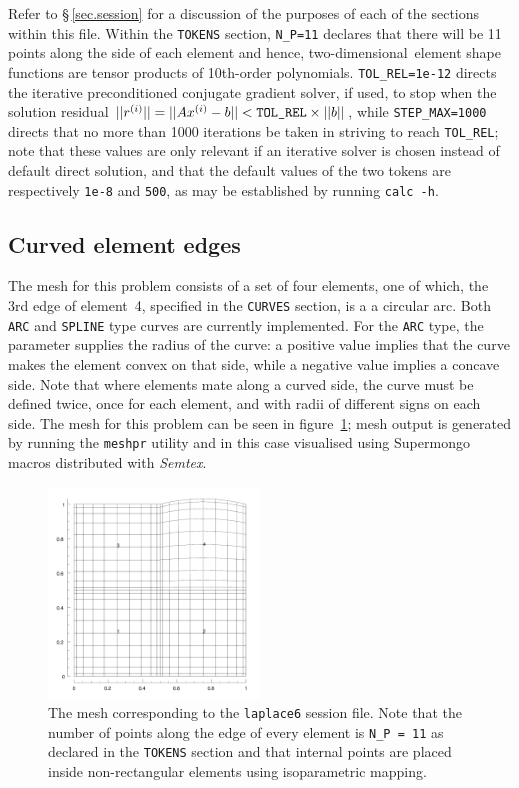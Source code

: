 \documentclass[11pt]{report}
\newcommand{\Semtex}{\emph{Semtex}} \newcommand{\Dog}{\emph{Dog}}
\newcommand\twod{two-di\-men\-sion\-al}
\begin{document}
Refer to \S\,\ref{sec.session} for a discussion of the purposes of
each of the sections within this file.  Within the \verb|TOKENS|
section, \verb|N_P=11| declares that there will be 11 points along the
side of each element and hence, \twod\ element shape functions are
tensor products of 10th-order polynomials.  \verb|TOL_REL=1e-12|
directs the iterative preconditioned conjugate gradient solver, if
used, to stop when the solution residual $||r^{(i)}|| = ||A x^{(i)} -
b|| < \verb|TOL_REL|\times||b||$, while \verb|STEP_MAX=1000| directs that
no more than 1000 iterations be taken in striving to reach
\verb|TOL_REL|; note that these values are only relevant if an
iterative solver is chosen instead of default direct solution, and
that the default values of the two tokens are respectively \verb|1e-8|
and \verb|500|, as may be established by running \verb|calc -h|.

\subsection{Curved element edges}
\label{sec.curves}

The mesh for this problem consists of a set of four elements, one of
which, the 3rd edge of element~4, specified in the \texttt{CURVES}
section, is a a circular arc.  Both \texttt{ARC} and \texttt{SPLINE}
type curves are currently implemented.  For the \texttt{ARC} type, the
parameter supplies the radius of the curve: a positive value implies
that the curve makes the element convex on that side, while a negative
value implies a concave side.  Note that where elements mate along a
curved side, the curve must be defined twice, once for each element,
and with radii of different signs on each side.  The mesh for this
problem can be seen in figure~\ref{lapcurve}; mesh output is generated
by running the \verb|meshpr| utility and in this case visualised using
Supermongo macros distributed with \Semtex.

\begin{figure}
\begin{center}
\includegraphics[width=0.5\textwidth]{laplace6mesh}
\end{center}
\caption{
\label{lapcurve}
  The mesh corresponding to the \texttt{laplace6} session file.  Note
  that the number of points along the edge of every element is
  \texttt{N\_P = 11} as declared in the \texttt{TOKENS} section and
  that internal points are placed inside non-rectangular elements
  using isoparametric mapping. }
\end{figure}
\end{document}
